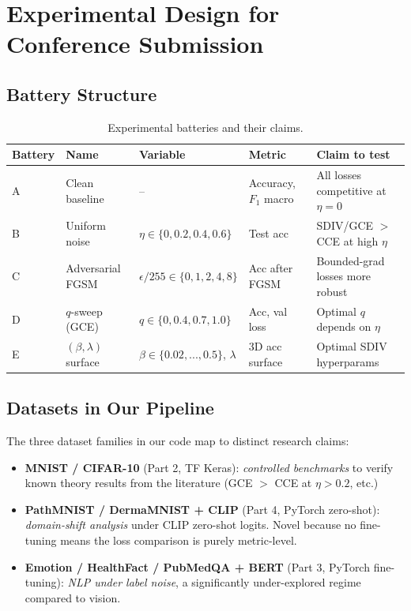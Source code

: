 \documentclass[11pt,a4paper]{article}
\begin{document}
\section{Experimental Design for Conference Submission}
\label{sec:expdesign}

\subsection{Battery Structure}

\begin{table}[h]
\centering\small
\begin{tabular}{@{}lllll@{}}
\toprule
\textbf{Battery} & \textbf{Name} & \textbf{Variable} & \textbf{Metric} & \textbf{Claim to test} \\
\midrule
A & Clean baseline   & -- & Accuracy, $F_1$ macro & All losses competitive at $\eta=0$ \\
B & Uniform noise    & $\eta \in \{0,0.2,0.4,0.6\}$ & Test acc & SDIV/GCE $>$ CCE at high $\eta$ \\
C & Adversarial FGSM & $\epsilon/255 \in \{0,1,2,4,8\}$ & Acc after FGSM & Bounded-grad losses more robust \\
D & $q$-sweep (GCE)  & $q \in \{0, 0.4, 0.7, 1.0\}$ & Acc, val loss & Optimal $q$ depends on $\eta$ \\
E & $(\beta,\lambda)$ surface & $\beta \in \{0.02,...,0.5\}$, $\lambda$ & 3D acc surface & Optimal SDIV hyperparams \\
\bottomrule
\end{tabular}
\caption{Experimental batteries and their claims.}
\end{table}

\subsection{Datasets in Our Pipeline}

The three dataset families in our code map to distinct research claims:

\begin{itemize}
  \item \textbf{MNIST / CIFAR-10} (Part 2, TF Keras): \emph{controlled benchmarks} to verify
  known theory results from the literature (GCE $>$ CCE at $\eta > 0.2$, etc.)
  \item \textbf{PathMNIST / DermaMNIST + CLIP} (Part 4, PyTorch zero-shot):
  \emph{domain-shift analysis} under CLIP zero-shot logits. Novel because no fine-tuning
  means the loss comparison is purely metric-level.
  \item \textbf{Emotion / HealthFact / PubMedQA + BERT} (Part 3, PyTorch fine-tuning):
  \emph{NLP under label noise}, a significantly under-explored regime compared to vision.
\end{itemize}
\end{document}
